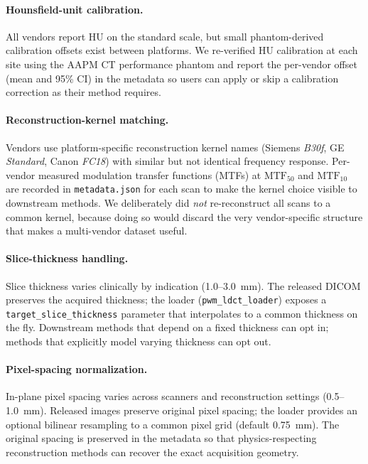 \documentclass[twoside,11pt]{article}
\begin{document}
\paragraph{Hounsfield-unit calibration.} All vendors report HU on the standard scale, but small phantom-derived calibration offsets exist between platforms. We re-verified HU calibration at each site using the AAPM CT performance phantom and report the per-vendor offset (mean and 95\% CI) in the metadata so users can apply or skip a calibration correction as their method requires.

\paragraph{Reconstruction-kernel matching.} Vendors use platform-specific reconstruction kernel names (Siemens \textit{B30f}, GE \textit{Standard}, Canon \textit{FC18}) with similar but not identical frequency response. Per-vendor measured modulation transfer functions (MTFs) at $\textrm{MTF}_{50}$ and $\textrm{MTF}_{10}$ are recorded in \texttt{metadata.json} for each scan to make the kernel choice visible to downstream methods. We deliberately did \emph{not} re-reconstruct all scans to a common kernel, because doing so would discard the very vendor-specific structure that makes a multi-vendor dataset useful.

\paragraph{Slice-thickness handling.} Slice thickness varies clinically by indication (1.0--3.0~mm). The released DICOM preserves the acquired thickness; the loader (\texttt{pwm\_ldct\_loader}) exposes a \texttt{target\_slice\_thickness} parameter that interpolates to a common thickness on the fly. Downstream methods that depend on a fixed thickness can opt in; methods that explicitly model varying thickness can opt out.

\paragraph{Pixel-spacing normalization.} In-plane pixel spacing varies across scanners and reconstruction settings (0.5--1.0~mm). Released images preserve original pixel spacing; the loader provides an optional bilinear resampling to a common pixel grid (default 0.75~mm). The original spacing is preserved in the metadata so that physics-respecting reconstruction methods can recover the exact acquisition geometry.
\end{document}
